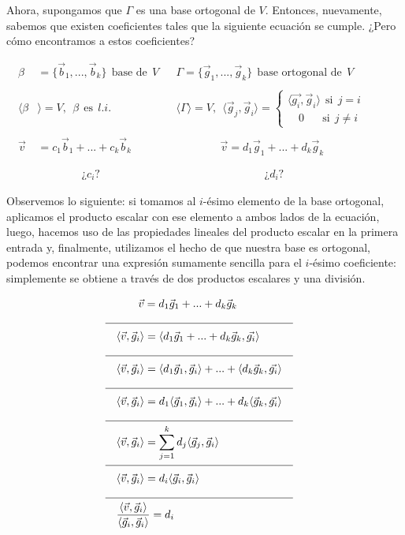 \documentclass[12pt,dvipsnames]{article}
\numberwithin{equation}{section}
\begin{document}
Ahora, supongamos que $\Gamma$ es una base ortogonal de $V$. Entonces, nuevamente, sabemos que existen coeficientes tales que la siguiente ecuación se cumple. ¿Pero cómo encontramos a estos coeficientes?

\begin{align*}
    \beta&=\{\vec{b}_1,...,\vec{b}_k\} \ \ \text{base de} \ \ V& &\Gamma=\{\vec{g}_1,...,\vec{g}_k\} \ \ \text{base ortogonal de} \ \ V& & &\\
    \\
    \langle\beta&\rangle = V, \ \ \beta \ \ \text{es} \ \ l.i.& &\langle\Gamma\rangle = V, \ \ \langle \vec{g}_j , \vec{g}_i \rangle = \begin{cases} \langle\vec{g_i}, \vec{g}_i\rangle \ \ \text{si} \ \ j = i \\ \quad 0 \quad \ \ \ \text{si} \ \ j\neq i \end{cases}& & &\\
    \\
    \vec{v}&= c_1\vec{b}_1 + ... + c_k\vec{b}_k& &\quad \quad \quad \quad \vec{v}= d_1\vec{g}_1 + ... + d_k\vec{g}_k& & & \\
    \\
    \\
    &\quad \quad \quad \quad \text{¿}c_i\text{?}& & \quad \quad \quad \quad \quad \quad \quad \quad \text{¿}d_i\text{?} & & &
\end{align*}

Observemos lo siguiente: si tomamos al $i$-ésimo elemento de la base ortogonal, aplicamos el producto escalar con ese elemento a ambos lados de la ecuación, luego, hacemos uso de las propiedades lineales del producto escalar en la primera entrada y, finalmente, utilizamos el hecho de que nuestra base es ortogonal, podemos encontrar una expresión sumamente sencilla para el $i$-ésimo coeficiente: simplemente se obtiene a través de dos productos escalares y una división.

\begin{align*}
    & & & \quad \quad \vec{v}= d_1\vec{g}_1 + ... + d_k\vec{g}_k& & & \\
    \cline{1-8}
    & & &\langle \vec{v} , \vec{g}_i \rangle = \langle d_1\vec{g}_1 + ... + d_k\vec{g}_k , \vec{g_i} \rangle& & & \\
    \cline{1-8}
    & & &\langle \vec{v} , \vec{g}_i \rangle = \langle d_1\vec{g}_1,\vec{g}_i\rangle + ... + \langle d_k\vec{g}_k , \vec{g_i} \rangle& & & \\
    \cline{1-8}
    & & &\langle \vec{v} , \vec{g}_i \rangle = d_1\langle \vec{g}_1, \vec{g}_i\rangle + ... + d_k\langle \vec{g}_k , \vec{g_i} \rangle& & & \\
    \cline{1-8}
    & & &\langle \vec{v} , \vec{g}_i \rangle = \sum_{j=1}^k d_j\langle \vec{g}_j, \vec{g}_i\rangle& & & \\
    \cline{1-8}
    & & &\langle \vec{v} , \vec{g}_i \rangle = d_i \langle\vec{g}_i, \vec{g}_i\rangle& & & \\
    \cline{1-8}
    & & &\frac{\langle \vec{v} ,\vec{g}_i \rangle}{\langle\vec{g}_i, \vec{g}_i\rangle} = d_i& & &
\end{align*}
\end{document}

